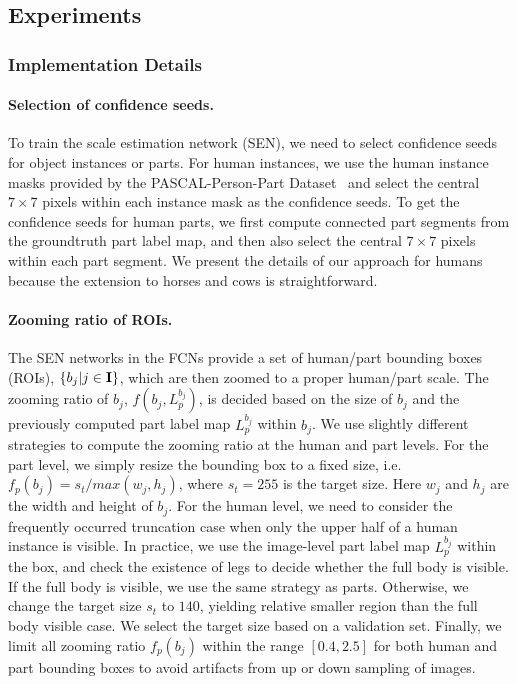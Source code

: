 \subsection{Experiments}
\label{subsec:exp}

\subsubsection{Implementation Details}
\paragraph{\textbf{Selection of confidence seeds.}}
To train the scale estimation network (SEN), we need to select confidence seeds for object instances or parts.
For human instances, we use the human instance masks provided by the PASCAL-Person-Part Dataset~\cite{chen2014detect} and
select the central $7\times7$ pixels within each instance mask as the confidence seeds. To get the confidence seeds for human parts,
we first compute connected part segments from the groundtruth part label map, and then also select the central $7\times7$ pixels within each part segment.
We present the details of our approach for humans because the extension to horses and cows is straightforward.

\paragraph{\textbf{Zooming ratio of ROIs.}}
The SEN networks in the FCNs provide a set of human/part bounding boxes (ROIs), $\{b_j | j\in {\mathbf I}\}$,
which are then zoomed to a proper human/part scale. The zooming ratio of $b_j$, $f(b_j, L^{b_j}_p)$,
is decided based on the size of $b_j$ and the previously computed part label map $L^{b_j}_p$ within $b_j$.
We use slightly different strategies to compute the zooming ratio at the human and part levels. 
For the part level, we simply resize the bounding box to a fixed size, i.e. $f_p(b_j) = s_t / max(w_j, h_j)$,
where $s_t = 255$ is the target size. Here $w_j$ and $h_j$ are the width and height of $b_j$. 
For the human level, we need to consider the frequently occurred truncation case when only the upper half of a human instance is visible. 
In practice, we use the image-level part label map $L^{b_j}_p$ within the box, and check the existence of legs to decide whether the full body is visible.
If the full body is visible, we use the same strategy as parts. Otherwise, we change the target size $s_t$ to $140$,
yielding relative smaller region than the full body visible case. We select the target size based on a validation set. 
Finally, we limit all zooming ratio $f_p(b_j)$ within the range $[0.4, 2.5]$ for both human and part bounding boxes to avoid artifacts from up or down sampling of images.

